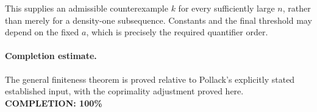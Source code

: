This supplies an admissible counterexample \(k\) for every sufficiently large \(n\), rather than merely for a density-one subsequence. Constants and the final threshold may depend on the fixed \(a\), which is precisely the required quantifier order.

\paragraph{Completion estimate.}
The general finiteness theorem is proved relative to Pollack's explicitly stated established input, with the coprimality adjustment proved here.
\textbf{COMPLETION: 100\%}
